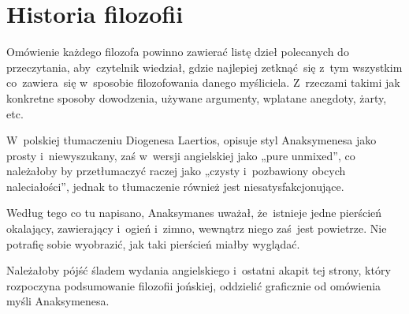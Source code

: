 \documentclass[a4paper,11pt]{article}
\begin{document}
\newpage
\section{Historia filozofii}

\vspace{\spaceTwo}







\start Omówienie każdego filozofa powinno zawierać listę dzieł
polecanych do przeczytania, aby~czytelnik wiedział, gdzie najlepiej
zetknąć~się z~tym wszystkim co~zawiera~się w~sposobie filozofowania
danego myśliciela. Z~rzeczami takimi jak konkretne sposoby dowodzenia,
używane argumenty, wplatane anegdoty, żarty, etc.

\vspace{\spaceThree}







\start {} W~polskiej tłumaczeniu Diogenesa Laertios, opisuje
styl Anaksymenesa jako prosty i~niewyszukany, zaś w~wersji angielskiej
jako „pure unmixed”, co należałoby by przetłumaczyć raczej jako
„czysty i~pozbawiony obcych naleciałości”, jednak to tłumaczenie
również jest niesatysfakcjonujące.

\vspace{\spaceFour}





\start {} Według tego co tu napisano, Anaksymanes uważał,
że~istnieje jedne pierścień okalający, zawierający i~ogień i~zimno,
wewnątrz niego zaś~jest powietrze. Nie potrafię sobie wyobrazić, jak
taki pierścień miałby wyglądać.

\vspace{\spaceFour}





\start {} Należałoby pójść śladem wydania angielskiego i~ostatni
akapit tej strony, który rozpoczyna podsumowanie filozofii jońskiej,
oddzielić graficznie od omówienia myśli Anaksymenesa.
\end{document}
